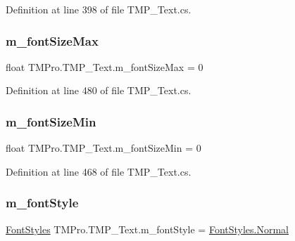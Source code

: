 Definition at line 398 of file T\+M\+P\+\_\+\+Text.\+cs.

\mbox{\label{class_t_m_pro_1_1_t_m_p___text_a3150edc89ccac43135fef3b847e750ee}} 
\subsubsection{\texorpdfstring{m\_fontSizeMax}{m\_fontSizeMax}}
{\footnotesize\ttfamily float T\+M\+Pro.\+T\+M\+P\+\_\+\+Text.\+m\+\_\+font\+Size\+Max = 0\hspace{0.3cm}{\ttfamily [protected]}}



Definition at line 480 of file T\+M\+P\+\_\+\+Text.\+cs.

\mbox{\label{class_t_m_pro_1_1_t_m_p___text_a44ebb77466dd58981e0d55d58f931746}} 
\subsubsection{\texorpdfstring{m\_fontSizeMin}{m\_fontSizeMin}}
{\footnotesize\ttfamily float T\+M\+Pro.\+T\+M\+P\+\_\+\+Text.\+m\+\_\+font\+Size\+Min = 0\hspace{0.3cm}{\ttfamily [protected]}}



Definition at line 468 of file T\+M\+P\+\_\+\+Text.\+cs.

\mbox{\label{class_t_m_pro_1_1_t_m_p___text_aa158e46ce4739a66372d3f9467e80216}} 
\subsubsection{\texorpdfstring{m\_fontStyle}{m\_fontStyle}}
{\footnotesize\ttfamily \mbox{\hyperlink{namespace_t_m_pro_aedf79b6e7e2ce2b9c9ac84e790596e7c}{Font\+Styles}} T\+M\+Pro.\+T\+M\+P\+\_\+\+Text.\+m\+\_\+font\+Style = \mbox{\hyperlink{namespace_t_m_pro_aedf79b6e7e2ce2b9c9ac84e790596e7ca960b44c579bc2f6818d2daaf9e4c16f0}{Font\+Styles.\+Normal}}\hspace{0.3cm}{\ttfamily [protected]}}



